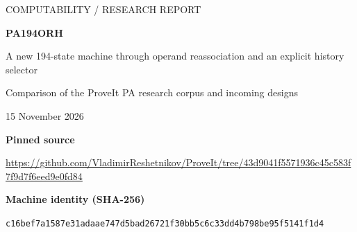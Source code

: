 \documentclass[11pt,a4paper]{article}
\theoremstyle{definition}
\newcommand{\ipra}{\mathrm{iPRA}}
\newcommand{\PA}{\mathrm{PA}}
\newcommand{\Con}{\operatorname{Con}}
\newcommand{\Halt}{\operatorname{Halt}}
\begin{document}
\begin{titlepage}
\vspace*{12mm}
{\Large\sffamily COMPUTABILITY / RESEARCH REPORT\par}
\vspace{9mm}
{\huge\bfseries PA194ORH\par}
\vspace{4mm}
{\LARGE A new 194-state machine through operand reassociation and an explicit history selector\par}
\vspace{10mm}
{\large Comparison of the ProveIt PA research corpus and incoming designs\par}
\vspace{4mm}
15 November 2026\par
\vspace{8mm}
\begin{abstract}
No valid machine with fewer than 194 working states was obtained. This
report supplies the requested alternative: a new complete binary Turing
machine, PA194ORH, with 194 working states, together with a written
$\ipra$ proof of its nonhalting equivalence to the calibrated PA194AX11H
machine. Composing with the reviewed, revised AX11H written calibration
gives $\ipra\vdash\Con(\PA)\leftrightarrow\neg\Halt_{\rm blank}(\mathrm{PA194ORH})$.
The result is a mathematical proof and executable certificate package;
it is not a new completed Lean proof.

The change reassociates a closed operand routine, recodes 134 source
addresses, and separates a hidden history-selector use of its entry
control. A tempting 193-state version fails exactly because it omits that
separation. Independent literal-table replay checks all 4,778 source
outcomes for arbitrary registers and a symbolic finite spare list, and
reproduces the complete 57,942-step blank initialization. An explicit
polynomial clock translates halting witnesses in both directions.

The comparison covers 97 research packets at a pinned repository commit,
including all four incoming archives: 83 named principal or supplementary
designs in 29 mechanism families. A fresh explicit-table census finds
520 spanning 194-state graph classes. PA194ORH is distinct from every
one under a broad structural equivalence. This census includes experiments
and rejected candidates; its graph classes are not 520 proved consistency
machines. The archive includes the full transition table, construction,
proofs, independent verification, comparison ledgers, and failed reduction
experiments with their actual scope.
\end{abstract}
\vfill
\noindent\textbf{Pinned source}\par
\small\url{https://github.com/VladimirReshetnikov/ProveIt/tree/43d9041f5571936c45c583f7f9d7f6eed9e0fd84}\par
\medskip
\noindent\textbf{Machine identity (SHA-256)}\par
\small\nolinkurl{c16bef7a1587e31adaae747d5bad26721f30bb5c6c33dd4b798be95f5141f1d4}\par
\end{titlepage}
\begingroup
\small
\setlength{\parskip}{0pt}
\tableofcontents
\endgroup
\clearpage
\end{document}
